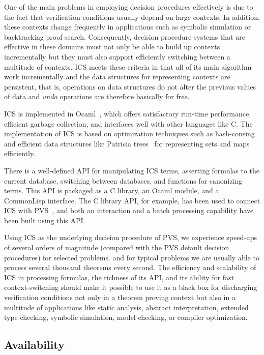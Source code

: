 \documentclass[12pt]{article}
\begin{document}
One of the main problems in employing decision procedures
effectively is due to the fact that verification conditions
usually depend on large contexts.  In addition, these
contexts change frequently in applications such as
symbolic simulation or backtracking proof search.
Consequently, decision procedure systems that
are effective in these domains must not only be able to
build up contexts incrementally but they must
also support efficiently switching between a multitude
of contexts.  ICS meets these criteria in that all of its
main algorithm work incrementally and the data
structures for representing contexts are persistent,
that is, operations on data structures do not alter the
previous values of data and {\em undo} operations
are therefore basically for free.

ICS is implemented in \textsf{Ocaml}~\cite{ObjectiveCaml},
which offers satisfactory run-time performance,
efficient garbage collection, and interfaces well with other
languages like C\@.  The implementation of ICS is based on optimization
techniques such as hash-consing~\cite{JCF2000}
and efficient data structures like Patricia trees~\cite{OkasakiGill98}
for representing sets and maps efficiently.

There is a well-defined API for manipulating ICS terms, asserting
formulas to the current database, switching between databases,
and functions for canonizing terms.
This API is packaged as a C library, an \textsf{Ocaml} module,
and a CommonLisp interface. The C library API, for example, has been
used to connect ICS with PVS~\cite{PVS}\@, and both an interaction and
a batch processing capability have been built using this API\@.

Using ICS as the underlying decision procedure of PVS, we
experience speed-ups of several orders of magnitude (compared
with the PVS default decision procedures) for selected problems.
and for typical problems we are usually able to process several
thousand theorems every second.
The efficiency and scalability of ICS in processing formulas,
the richness of its API, and its ability for fast context-switching
should make it possible to use it as a black box for discharging
verification conditions not only in a theorem proving context
but also in a multitude of applications like static analysis,
abstract interpretation, extended type checking,
symbolic simulation, model checking, or compiler
optimization.

\subsection{Availability}
\end{document}
